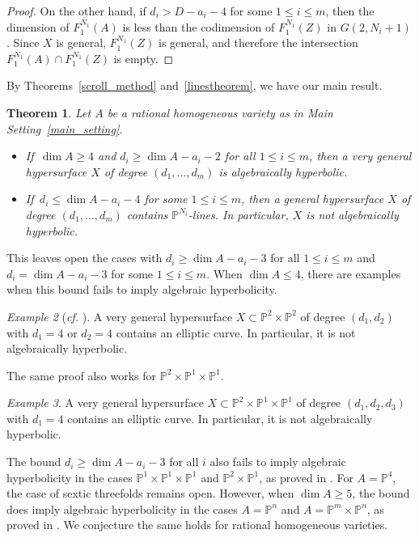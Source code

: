 \documentclass[10pt,a4paper]{article}
\numberwithin{equation}{section}
\newtheorem{theorem}{Theorem}[section]
\theoremstyle{definition}
\theoremstyle{remark}
\newtheorem{example}[theorem]{Example}
\renewcommand{\P}{\mathbb{P}}
\begin{document}
\begin{proof}
    On the other hand, if $d_i > D - a_i - 4$ for some $1\le i\le m$, then the dimension of $F_1^{N_1}(A)$ is less than the codimension of $F_1^{N_1}(Z)$ in $G(2, N_i+1)$. Since $X$ is general, $F_1^{N_1}(Z)$ is general, and therefore the intersection $F_1^{N_1}(A)\cap F_1^{N_1}(Z)$ is empty.
\end{proof}

By Theorems~\ref{scroll_method} and~\ref{linestheorem}, we have our main result.

\begin{theorem}\label{oTeorema}
    Let $A$ be a rational homogeneous variety as in  Main Setting~\ref{main_setting}.
    \begin{itemize}
        \item If\, $\dim A\ge 4$ and $d_i\ge \dim A-a_i-2$ for all $1\le i\le m$, then a very general hypersurface $X$ of degree $(d_1, \hdots, d_m)$ is algebraically hyperbolic.
        \item If\, $d_i\le \dim A - a_i - 4$ for some $1\le i\le m$, then a general hypersurface $X$ of degree $(d_1, \hdots, d_m)$ contains $\P^{N_i}$-lines. In particular, $X$ is not algebraically hyperbolic.
    \end{itemize}
\end{theorem}


This leaves open the cases with $d_i\ge \dim A - a_i - 3$ for all $1\le i\le m$ and $d_i = \dim A-a_i-3$ for some $1\le i\le m$. When $\dim A\le 4$, there are examples when this bound fails to imply algebraic hyperbolicity. 

\begin{example}[\textit{cf.} {\cite[Lemma 4.2]{Y22}}]\label{Example_2_2}
    A very general hypersurface $X\subset \P^2\times \P^2$ of degree $(d_1,d_2)$ with $d_1=4$ or $d_2=4$ contains an elliptic curve. In particular, it is not algebraically hyperbolic.
\end{example}

The same proof also works for $\P^2\times \P^1\times \P^1$.

\begin{example}\label{Example_2_1_1}
    A very general hypersurface $X\subset \P^2\times \P^1\times \P^1$ of degree $(d_1,d_2,d_3)$ with $d_1=4$ contains an elliptic curve. In particular, it is not algebraically hyperbolic.
\end{example}

The bound $d_i\ge \dim A - a_i - 3$ for all $i$ also fails to imply algebraic hyperbolicity in the cases $\P^1\times \P^1\times \P^1$ and $\P^2\times \P^1$, as proved in \cite{CR19}. For $A = \P^4$, the case of sextic threefolds remains open.
%
However, when $\dim A\ge 5$, the bound does imply algebraic hyperbolicity in the cases $A = \P^n$ and $A=\P^m\times \P^n$, as proved in \cite{Y22}. We conjecture the same holds for rational homogeneous varieties.
\end{document}
